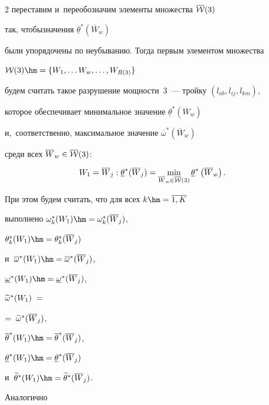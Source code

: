 \begin{multicols}{2}
переставим и~пе\-ре\-обозначим элементы множества $\overline{\cal W}(3)$ 


так, чтобы\linebreak значения $\underline {\theta}^*(\overline {W}_w)$ 


были упорядочены по неубыванию. Тогда первым элементом множества 


${\cal W}(3) \hm= \{ W_1, \ldots W_w, \ldots, W_{R(3)} \}$ 


будем считать такое разрушение мощности~3~--- тройку $(l_{ab}, l_{ij}, l_{km})$,\linebreak 


которое обеспечивает минимальное значение $\underline {\theta}^*(\overline {W}_w)$ 


и,~соответственно, максимальное значение $\overline {\omega}^*(\overline {W}_w)$ 


среди всех $\overline {W}_w \in \overline{\cal W}(3)$:


$$


W_1 = \overline {W}_j:  \underline {\theta}^*(\overline {W}_j) = 


\min\limits_{\overline {W}_w \in \overline{\cal W}(3)} \underline {\theta}^*


\left(\overline {W}_w\right). 


$$


При этом будем считать, что для всех $k \hm= \overline{1, K}$   


выполнено  $\omega_k^*(W_1) \hm= \omega_k^*(\overline {W}_{j})$, 


$\theta_k^*( W_1) \hm= \theta_k^*(\overline {W}_{j})$


и~$\overline {\omega}^*(W_1) \hm= \overline {\omega}^*(\overline {W}_{j})$, 


$\underline {\omega}^*( W_1)\hm = \underline {\omega}^*(\overline {W}_{j})$, 


$\widetilde {\omega}^*(W_{1})\;=$


$=\;\widetilde {\omega}^*(\overline {W}_{j})$, 


$\overline {\theta}^*(W_{1}) \hm= \overline {\theta}^*(\overline {W}_{j})$, 


$\underline {\theta}^*(W_{1}) \hm= \underline {\theta}^*(\overline {W}_{j})$ 


и~$\wl {\theta}^*( W_{1}) \hm= \wl {\theta}^*(\overline {W}_{j})$.





Аналогично


$$



\end{multicols}

